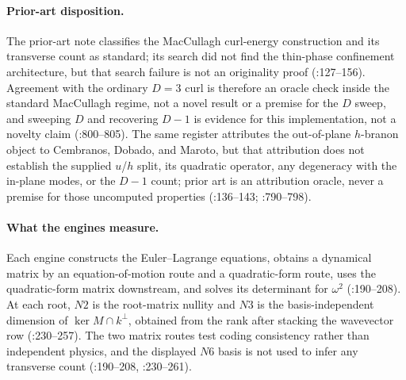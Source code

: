 \paragraph{Prior-art disposition.}
The prior-art note classifies the MacCullagh curl-energy construction and its
transverse count as standard; its search did not find the thin-phase confinement
architecture, but that search failure is not an originality proof
(:127--156).
Agreement with the ordinary \(D=3\) curl is therefore an oracle check inside the
standard MacCullagh regime, not a novel result or a premise for the \(D\) sweep,
and sweeping \(D\) and recovering \(D-1\) is evidence for this implementation,
not a novelty claim
(:800--805).
The same register attributes the out-of-plane \(h\)-branon object to Cembranos,
Dobado, and Maroto, but that attribution does not establish the supplied
\(u\)/\(h\) split, its quadratic operator, any degeneracy with the in-plane
modes, or the \(D-1\) count; prior art is an attribution oracle, never a premise
for those uncomputed properties
(:136--143;
:790--798).

\paragraph{What the engines measure.}
Each engine constructs the Euler--Lagrange equations, obtains a dynamical matrix
by an equation-of-motion route and a quadratic-form route, uses the
quadratic-form matrix downstream, and solves its determinant for
\(\omega^2\) (:190--208).
At each root, \(N2\) is the root-matrix nullity and \(N3\) is the
basis-independent dimension of
\(\ker M\cap k^\perp\), obtained from the rank after stacking the wavevector row
(:230--257).
The two matrix routes test coding consistency rather than independent physics,
and the displayed \(N6\) basis is not used to infer any transverse count
(:190--208,
:230--261).

